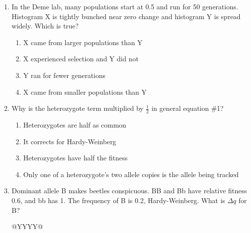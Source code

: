 \documentclass[11pt]{article}
\begin{document}
\begin{enumerate}[label=\textbf{\arabic*.}, leftmargin=2em, itemsep=1.4em]
\begin{enumerate}[label={}, leftmargin=2.4em, labelwidth=0pt, itemsep=2pt, topsep=0pt]
\end{enumerate}
\item In the Deme lab, many populations start at 0.5 and run for 50 generations. Histogram X is tightly bunched near zero change and histogram Y is spread widely. Which is true?
\par\smallskip
\begin{enumerate}[label={}, leftmargin=2.4em, labelwidth=0pt, itemsep=2pt, topsep=0pt]
\item \hspace*{-2.4em}X came from larger populations than Y
\item \hspace*{-2.4em}X experienced selection and Y did not
\item \hspace*{-2.4em}Y ran for fewer generations
\item \hspace*{-2.4em}X came from smaller populations than Y
\end{enumerate}
\item Why is the heterozygote term multiplied by \(\tfrac{1}{2}\) in general equation \#1?
\par\smallskip
\begin{enumerate}[label={}, leftmargin=2.4em, labelwidth=0pt, itemsep=2pt, topsep=0pt]
\item \hspace*{-2.4em}Heterozygotes are half as common
\item \hspace*{-2.4em}It corrects for Hardy-Weinberg
\item \hspace*{-2.4em}Heterozygotes have half the fitness
\item \hspace*{-2.4em}Only one of a heterozygote's two allele copies is the allele being tracked
\end{enumerate}
\item Dominant allele B makes beetles conspicuous. BB and Bb have relative fitness 0.6, and bb has 1. The frequency of B is 0.2, Hardy-Weinberg. What is \(\Delta q\) for B?
\par\smallskip\noindent\begin{tabularx}{\linewidth}{@{}YYYY@{}}

\end{tabularx}
\end{enumerate}
\end{document}
